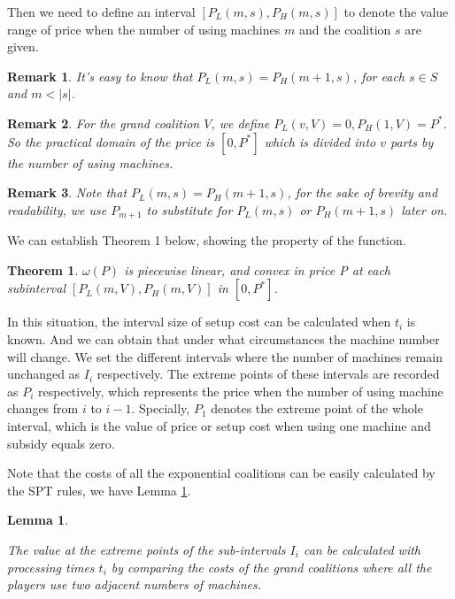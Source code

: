 \documentclass[UTF8]{article}
\newtheorem{thm}{\hspace{2em}Theorem}
\newtheorem{lem}{\hspace{2em}Lemma}
\newtheorem{remark}{\hspace{2em}Remark}
\begin{document}
Then we need to define an interval $[P_L(m,s),P_H(m,s)]$ to denote the value range of price when the number of using machines $m$ and the coalition $s$ are given.

\begin{remark}
  It's easy to know that $P_L(m,s) = P_H(m+1,s)$, for each $s \in S$ and $ m <|s|$.
\end{remark}

\begin{remark}
  For the grand coalition $V$, we define $P_L(v,V) = 0, P_H(1,V) = P^*$. So the practical domain of the price is $[0,P^*]$ which is divided into $v$ parts by the number of using machines.
\end{remark}

\begin{remark}
  Note that $P_L(m,s) = P_H(m+1,s)$, for the sake of brevity and readability, we use $P_{m+1}$ to substitute for $P_L(m,s)$ or $P_H(m+1,s)$ later on.

\end{remark}

We can establish Theorem 1 below, showing the property of the function.

\begin{thm}\label{thm1}
$\omega(P)$ is piecewise linear, and convex in price P at each subinterval $[P_L(m,V),P_H(m,V)]$ in $[0,P^*] $.
\end{thm}


In this situation, the interval size of setup cost can be calculated when $t_i$ is known. And we can obtain that under what circumstances the machine number will change. We set the different intervals where the number of machines remain unchanged as $I_i$ respectively. The extreme points of these intervals are recorded as $P_i$ respectively, which represents the price when the number of using machine changes from $i$ to $i-1$. Specially, $P_1$ denotes the extreme point of the whole interval, which is the value of price or setup cost when using one machine and subsidy equals zero.

Note that the costs of all the exponential coalitions can be easily calculated by the SPT rules, we have Lemma \ref{lem1}.

\begin{lem}\label{lem1}

The value at the extreme points of the sub-intervals $I_i$ can be calculated with processing times $t_i$ by comparing the costs of the grand coalitions where all the players use two adjacent numbers of machines.
\end{lem}
\end{document}
